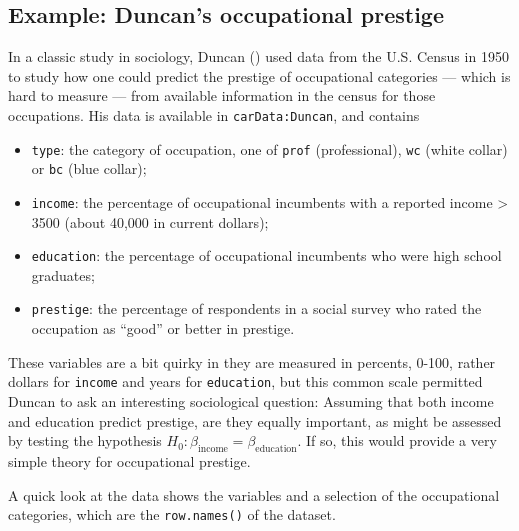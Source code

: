 \documentclass[
  letterpaper,
  10pt,
  krantz2]{krantz}
\providecommand{\tightlist}{%
  \setlength{\itemsep}{0pt}\setlength{\parskip}{0pt}}\usepackage{longtable,booktabs,array}
\begin{document}
{\subsection{Example: Duncan's occupational
prestige}\label{sec-example-duncan}

In a classic study in sociology, Duncan ()
used data from the U.S. Census in 1950 to study how one could predict
the prestige of occupational categories --- which is hard to measure ---
from available information in the census for those occupations. His data
is available in \texttt{carData:Duncan}, and contains

\begin{itemize}
\tightlist
\item
  \texttt{type}: the category of occupation, one of \texttt{prof}
  (professional), \texttt{wc} (white collar) or \texttt{bc} (blue
  collar);
\item
  \texttt{income}: the percentage of occupational incumbents with a
  reported income \textgreater{} 3500 (about 40,000 in current dollars);
\item
  \texttt{education}: the percentage of occupational incumbents who were
  high school graduates;
\item
  \texttt{prestige}: the percentage of respondents in a social survey
  who rated the occupation as ``good'' or better in prestige.
\end{itemize}

These variables are a bit quirky in they are measured in percents,
0-100, rather dollars for \texttt{income} and years for
\texttt{education}, but this common scale permitted Duncan to ask an
interesting sociological question: Assuming that both income and
education predict prestige, are they equally important, as might be
assessed by testing the hypothesis
\(H_0: \beta_{\text{income}} = \beta_{\text{education}}\). If so, this
would provide a very simple theory for occupational prestige.

A quick look at the data shows the variables and a selection of the
occupational categories, which are the \texttt{row.names()} of the
dataset.

}
\end{document}
